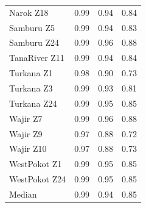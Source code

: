 \documentclass[review]{elsarticle}
\begin{document}
\begin{table}
\begin{tabular}{l|ccc}
		Narok Z18 &  0.99 & 0.94 & 0.84 \\
		Samburu Z5 &  0.99 & 0.94 & 0.83 \\
		Samburu Z24 & 0.99 & 0.96 & 0.88 \\
		TanaRiver Z11 &  0.99 & 0.94 & 0.84 \\
		Turkana Z1 &  0.98 & 0.90 & 0.73 \\
		Turkana Z3 &  0.99 & 0.93 & 0.81 \\
		Turkana Z24 & 0.99 & 0.95 & 0.85 \\
		Wajir Z7 & 0.99 & 0.96 & 0.88 \\
		Wajir Z9 &  0.97 & 0.88 & 0.72 \\
		Wajir Z10 &  0.97 & 0.88 & 0.73 \\
		WestPokot Z1 & 0.99 & 0.95 & 0.85 \\
		WestPokot Z24 &  0.99 & 0.95 & 0.85 \\
		\bottomrule
		Median &  0.99 & 0.94 & 0.85 \\
		\bottomrule
	\end{tabular}
\end{table}
\end{document}
